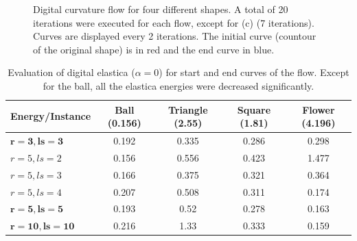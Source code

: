 \documentclass[runningheads]{llncs}
\begin{document}
\begin{figure}[!ht]
{		\hspace{15pt}
		\hspace{15pt}
		}

		\caption{Digital curvature flow for four different shapes. A total of 20 iterations were executed for each flow, except for (c) (7 iterations). Curves are displayed every 2 iterations. The initial curve (countour of the original shape) is in red and the end curve in blue.}
		\label{fig:digital_flows}	
	\end{figure}


\begin{table}[!ht]
\center
\begin{tabular}{l|c|c|c|c}
	Energy/Instance & Ball (0.156) & Triangle (2.55) & Square (1.81) & Flower (4.196) \\
	\hline
	$\mathbf{r=3,ls=3}$ & 0.192 & 0.335 & 0.286 & 0.298\\
	\hline
	$r=5,ls=2$ & 0.156 & 0.556 & 0.423 & 1.477 \\
	$r=5,ls=3$ & 0.166 & 0.375 & 0.321 & 0.364 \\	 
	$r=5,ls=4$ & 0.207 & 0.508 & 0.311 & 0.174\\
	$\mathbf{r=5,ls=5}$ & 0.193 & 0.52 & 0.278 & 0.163\\	
	\hline
	$\mathbf{r=10,ls=10}$ & 0.216 & 1.33 & 0.333 & 0.159		
\end{tabular}
\caption{Evaluation of digital elastica ($\alpha=0$) for start and end curves of the flow. Except for the ball, all the elastica energies were decreased significantly.}
\label{tab:digital_glows_elastica_result}
\end{table}
\end{document}
